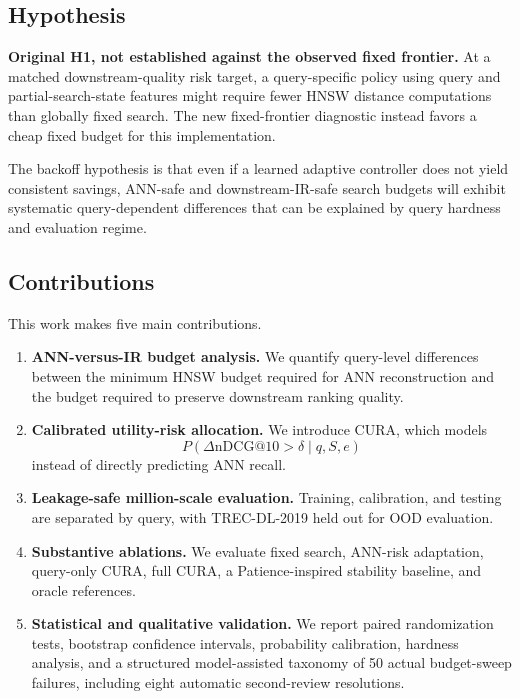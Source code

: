 \documentclass[10pt,twocolumn]{article}
\makeatletter
\newcommand{\cura}{CURA}
\newcommand{\deltandcg}{\Delta\mathrm{nDCG}@10}
\makeatother
\begin{document}
\subsection{Hypothesis}
\begin{tcolorbox}[colback=CuraLight,colframe=CuraGreen,boxrule=0.8pt,arc=3pt,left=5pt,right=5pt,top=4pt,bottom=4pt]
\small
\textbf{Original H1, not established against the observed fixed frontier.} At a matched downstream-quality risk target, a query-specific policy using query and partial-search-state features might require fewer HNSW distance computations than globally fixed search. The new fixed-frontier diagnostic instead favors a cheap fixed budget for this implementation.
\end{tcolorbox}

The backoff hypothesis is that even if a learned adaptive controller does not yield consistent savings, ANN-safe and downstream-IR-safe search budgets will exhibit systematic query-dependent differences that can be explained by query hardness and evaluation regime.

\subsection{Contributions}
This work makes five main contributions.
\begin{enumerate}
\item \textbf{ANN-versus-IR budget analysis.} We quantify query-level differences between the minimum HNSW budget required for ANN reconstruction and the budget required to preserve downstream ranking quality.
\item \textbf{Calibrated utility-risk allocation.} We introduce \cura{}, which models
\[
P(\deltandcg>\delta\mid q,S,e)
\]
instead of directly predicting ANN recall.
\item \textbf{Leakage-safe million-scale evaluation.} Training, calibration, and testing are separated by query, with TREC-DL-2019 held out for OOD evaluation.
\item \textbf{Substantive ablations.} We evaluate fixed search, ANN-risk adaptation, query-only \cura{}, full \cura{}, a Patience-inspired stability baseline, and oracle references.
\item \textbf{Statistical and qualitative validation.} We report paired randomization tests, bootstrap confidence intervals, probability calibration, hardness analysis, and a structured model-assisted taxonomy of 50 actual budget-sweep failures, including eight automatic second-review resolutions.
\end{enumerate}
\end{document}
